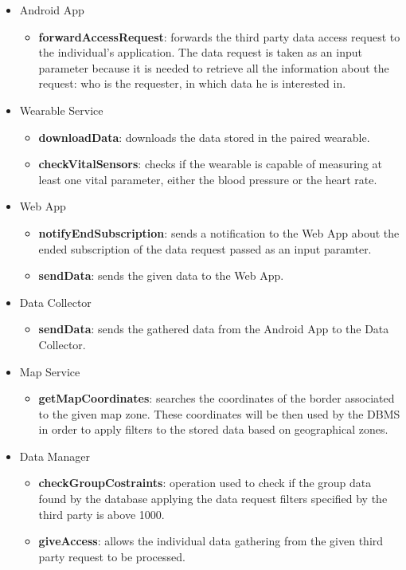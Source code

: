 \begin{itemize}
\item Android App
\begin{itemize}
\item \textbf{forwardAccessRequest}: forwards the third party data access request to the individual's application. The data request is taken as an input parameter because it is needed to retrieve all the information about the request: who is the requester, in which data he is interested in.
\end{itemize}
\item Wearable Service
\begin{itemize}
\item \textbf{downloadData}: downloads the data stored in the paired wearable.
\item \textbf{checkVitalSensors}: checks if the wearable is capable of measuring at least one vital parameter, either the blood pressure or the heart rate.
\end{itemize}
\item Web App
\begin{itemize}
\item \textbf{notifyEndSubscription}: sends a notification to the Web App about the ended subscription of the data request passed as an input paramter.
\item \textbf{sendData}: sends the given data to the Web App.
\end{itemize}
\item Data Collector
\begin{itemize}
\item \textbf{sendData}: sends the gathered data from the Android App to the Data Collector.
\end{itemize}
\item Map Service
\begin{itemize}
\item \textbf{getMapCoordinates}: searches the coordinates of the border associated to the given map zone. These coordinates will be then used by the DBMS in order to apply filters to the stored data based on geographical zones.
\end{itemize}
\item Data Manager
\begin{itemize}
\item \textbf{checkGroupCostraints}: operation used to check if the group data found by the database applying the data request filters specified by the third party is above 1000.
\item \textbf{giveAccess}: allows the individual data gathering from the given third party request to be processed.

\end{itemize}
\end{itemize}
